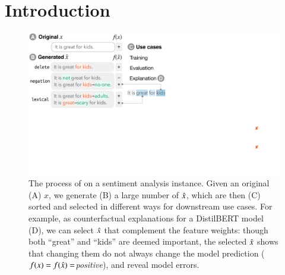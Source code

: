 \section{Introduction}
\label{sec:intro}

\begin{figure}[t]
\centering
\includegraphics[trim={0 18cm 31cm 0cm},clip, width=1\columnwidth]{figures/teaser}
\vspace{-15pt}
\caption{
The process of \sysname on a sentiment analysis instance.
Given an original (A) $x$, we generate (B) a large number of $\hat{x}$, which are then (C) sorted and selected in different ways for downstream use cases.
For example, as counterfactual explanations for a DistilBERT model (D), we can select $\hat{x}$ that complement the feature weights: though both ``great'' and ``kids'' are deemed important, the selected $\hat{x}$ shows that changing them do not always change the model prediction ($f(x)=f(\hat{x})=$\emph{positive}), and reveal model errors.
}
\vspace{-15pt}
\label{fig:teaser}
\end{figure} 
 

